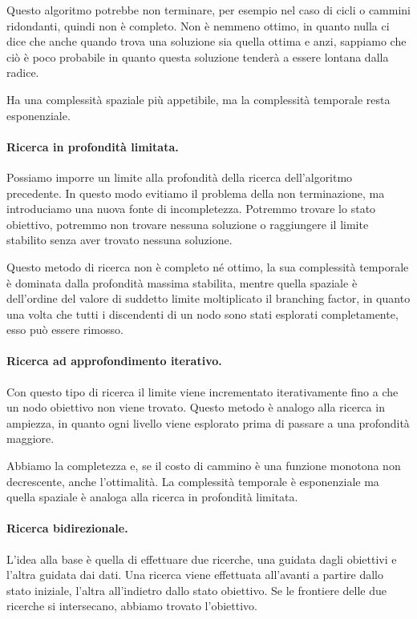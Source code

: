             Questo algoritmo potrebbe non terminare, per esempio nel caso di cicli o cammini ridondanti, quindi non è completo. Non è nemmeno ottimo, in quanto nulla ci dice che anche quando trova una soluzione sia quella ottima e anzi, sappiamo che ciò è poco probabile in quanto questa soluzione tenderà a essere lontana dalla radice.
            
            Ha una complessità spaziale più appetibile, ma la complessità temporale resta esponenziale.
            
            \paragraph{Ricerca in profondità limitata.} Possiamo imporre un limite alla profondità della ricerca dell'algoritmo precedente. In questo modo evitiamo il problema della non terminazione, ma introduciamo una nuova fonte di incompletezza. Potremmo trovare lo stato obiettivo, potremmo non trovare nessuna soluzione o raggiungere il limite stabilito senza aver trovato nessuna soluzione.
            
            Questo metodo di ricerca non è completo né ottimo, la sua complessità temporale è dominata dalla profondità massima stabilita, mentre quella spaziale è dell'ordine del valore di suddetto limite moltiplicato il branching factor, in quanto una volta che tutti i discendenti di un nodo sono stati esplorati completamente, esso può essere rimosso.
            
            \paragraph{Ricerca ad approfondimento iterativo.} Con questo tipo di ricerca il limite viene incrementato iterativamente fino a che un nodo obiettivo non viene trovato. Questo metodo è analogo alla ricerca in ampiezza, in quanto ogni livello viene esplorato prima di passare a una profondità maggiore.
            
            Abbiamo la completezza e, se il costo di cammino è una funzione monotona non decrescente, anche l'ottimalità. La complessità temporale è esponenziale ma quella spaziale è analoga alla ricerca in profondità limitata.
            
            \paragraph{Ricerca bidirezionale.} L'idea alla base è quella di effettuare due ricerche, una guidata dagli obiettivi e l'altra guidata dai dati. Una ricerca viene effettuata all'avanti a partire dallo stato iniziale, l'altra all'indietro dallo stato obiettivo. Se le frontiere delle due ricerche si intersecano, abbiamo trovato l'obiettivo.
            
